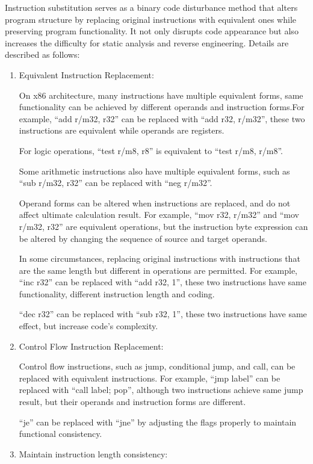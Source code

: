 Instruction substitution serves as a binary code disturbance method that alters program structure by replacing original instructions with equivalent ones while preserving program functionality. It not only disrupts code appearance but also increases the difficulty for static analysis and reverse engineering. Details are described as follows:
\begin{enumerate}

\item Equivalent Instruction Replacement:

On x86 architecture, many instructions have multiple equivalent forms, same functionality can be achieved by different operands and instruction forms.For example, “add r/m32, r32” can be replaced with “add r32, r/m32”, these two instructions are equivalent while operands are registers.

For logic operations, “test r/m8, r8” is equivalent to “test r/m8, r/m8”.

Some arithmetic instructions also have multiple equivalent forms, such as “sub r/m32, r32” can be replaced with “neg r/m32”.

Operand forms can be altered when instructions are replaced, and do not affect ultimate calculation result. For example, “mov r32, r/m32” and “mov r/m32, r32” are equivalent operations, but the instruction byte expression can be altered by changing the sequence of source and target operands.

In some circumstances, replacing original instructions with instructions that are the same length but different in operations are permitted.
For example, “inc r32” can be replaced with “add r32, 1”, these two instructions have same functionality, different instruction length and coding.

“dec r32” can be replaced with “sub r32, 1”, these two instructions have same effect, but increase code's complexity.

\item Control Flow Instruction Replacement:

Control flow instructions, such as jump, conditional jump, and call, can be replaced with equivalent instructions. For example, “jmp label” can be replaced with “call label; pop”, although two instructions achieve same jump result, but their operands and instruction forms are different.

“je” can be replaced with “jne” by adjusting the flags properly to maintain functional consistency.

\item Maintain instruction length consistency:


\end{enumerate}
